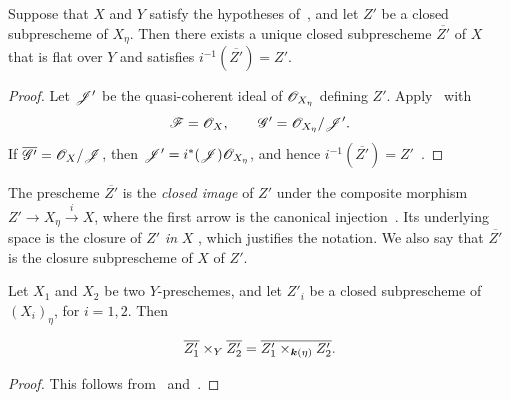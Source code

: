 \begin{proposition}[2.8.5]
\label{IV.2.8.5}
Suppose that $X$ and $Y$ satisfy the hypotheses
of~, and let $Z'$ be a closed subprescheme of
$X_\eta$. Then there exists a unique closed subprescheme
$\overline{Z'}$ of $X$ that is \textup{flat} over $Y$ and satisfies $i^{-1}(\overline{Z'})=Z'$.
\end{proposition}

\begin{proof}
Let $\mathscr{J}'$ be the quasi-coherent ideal of $\mathscr{O}_{X_\eta}$
defining $Z'$. Apply~ with
\[
  \mathscr{F}=\mathscr{O}_X,\qquad
  \mathscr{G}'=\mathscr{O}_{X_\eta}/\mathscr{J}'.
\]
If $\overline{\mathscr{G}'}=\mathscr{O}_X/\mathscr{J}$, then $\mathscr{J}'=i^*(\mathscr{J})\mathscr{O}_{X_\eta}$,
and hence
$i^{-1}(\overline{Z'})=Z'$~.
\end{proof}

The prescheme $\overline{Z'}$ is the \emph{closed image} of $Z'$ under
the composite morphism $Z'\longrightarrow X_\eta\xrightarrow{i}X$,
where the first arrow is the canonical injection~.
Its underlying space is the closure of $Z'$ \emph{in} $X$
, which justifies the notation. We also say that
$\overline{Z'}$ is the closure subprescheme of $X$ of $Z'$.

\begin{corollary}[2.8.6]
\label{IV.2.8.6}
Let $X_1$ and $X_2$ be two $Y$-preschemes, and let $Z'_i$ be a closed
subprescheme of $(X_i)_\eta$, for $i=1,2$. Then
\end{corollary}

\begin{env}[2.8.6.1]
\label{IV.2.8.6.1}
\[
  \overline{Z'_1}\times_Y\overline{Z'_2}
    =
  \overline{Z'_1\times_{\boldsymbol{k}(\eta)}Z'_2}.
\]
\end{env}

\begin{proof}
This follows from~ and~.
\end{proof}
